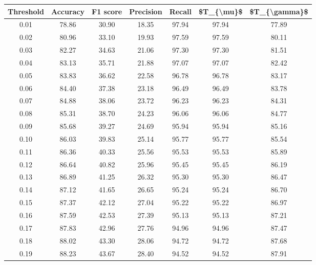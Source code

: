 \begin{tabular}{|c|c|c|c|c|c|c|}
\hline
 Threshold &  Accuracy &  F1 score &  Precision &  Recall &  \$T\_\{\textbackslash mu\}\$ &  \$T\_\{\textbackslash gamma\}\$ \\
\hline
      0.01 &     78.86 &     30.90 &      18.35 &   97.94 &      97.94 &         77.89 \\
      0.02 &     80.96 &     33.10 &      19.93 &   97.59 &      97.59 &         80.11 \\
      0.03 &     82.27 &     34.63 &      21.06 &   97.30 &      97.30 &         81.51 \\
      0.04 &     83.13 &     35.71 &      21.88 &   97.07 &      97.07 &         82.42 \\
      0.05 &     83.83 &     36.62 &      22.58 &   96.78 &      96.78 &         83.17 \\
      0.06 &     84.40 &     37.38 &      23.18 &   96.49 &      96.49 &         83.78 \\
      0.07 &     84.88 &     38.06 &      23.72 &   96.23 &      96.23 &         84.31 \\
      0.08 &     85.31 &     38.70 &      24.23 &   96.06 &      96.06 &         84.77 \\
      0.09 &     85.68 &     39.27 &      24.69 &   95.94 &      95.94 &         85.16 \\
      0.10 &     86.03 &     39.83 &      25.14 &   95.77 &      95.77 &         85.54 \\
      0.11 &     86.36 &     40.33 &      25.56 &   95.53 &      95.53 &         85.89 \\
      0.12 &     86.64 &     40.82 &      25.96 &   95.45 &      95.45 &         86.19 \\
      0.13 &     86.89 &     41.25 &      26.32 &   95.30 &      95.30 &         86.47 \\
      0.14 &     87.12 &     41.65 &      26.65 &   95.24 &      95.24 &         86.70 \\
      0.15 &     87.37 &     42.12 &      27.04 &   95.22 &      95.22 &         86.97 \\
      0.16 &     87.59 &     42.53 &      27.39 &   95.13 &      95.13 &         87.21 \\
      0.17 &     87.83 &     42.96 &      27.76 &   94.96 &      94.96 &         87.47 \\
      0.18 &     88.02 &     43.30 &      28.06 &   94.72 &      94.72 &         87.68 \\
      0.19 &     88.23 &     43.67 &      28.40 &   94.52 &      94.52 &         87.91 \\

\end{tabular}
